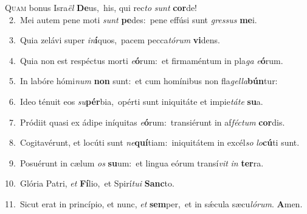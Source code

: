 \lettrine{\initial\textcolor{\initialcolor}{Q}}{uam} bonus Isra\textit{ël} \textbf{De}\-us,~\star his, qui rec\textit{to} \textit{sunt} \textbf{cor}\-de!\\
{\numbfont\textcolor{\numbcolor}{~2.}}~Mei autem pene moti \textit{sunt} \textbf{pe}\-des:~\star pene effúsi sunt \textit{gres}\-\textit{sus} \textbf{me}\-i.\par
{\numbfont\textcolor{\numbcolor}{~3.}}~Quia zelávi super \textit{in}\-\textbf{í}quos,~\star pacem pecca\-\textit{tó}\-\textit{rum} \textbf{vi}\-dens.\par
{\numbfont\textcolor{\numbcolor}{~4.}}~Quia non est respéctus morti \textit{e}\-\textbf{ó}rum:~\star et firmaméntum in pla\textit{ga} \textit{e}\-\textbf{ó}rum.\par
{\numbfont\textcolor{\numbcolor}{~5.}}~In labóre hómi\textit{num} \textbf{non} sunt:~\star et cum homínibus non fla\-\textit{gel}\-\textit{la}\textbf{bún}tur:\par
{\numbfont\textcolor{\numbcolor}{~6.}}~Ideo ténuit eos \textit{su}\-\textbf{pér}bia,~\star opérti sunt iniquitáte et impie\-\textit{tá}\-\textit{te} \textbf{su}\-a.\par
{\numbfont\textcolor{\numbcolor}{~7.}}~Pródiit quasi ex ádipe iníquitas \textit{e}\-\textbf{ó}rum:~\star transiérunt in af\-\textit{féc}\-\textit{tum} \textbf{cor}\-dis.\par
{\numbfont\textcolor{\numbcolor}{~8.}}~Cogitavérunt, et locúti sunt \textit{ne}\-\textbf{quí}tiam:~\star iniquitátem in excél\textit{so} \textit{lo}\-\textbf{cú}ti sunt.\par
{\numbfont\textcolor{\numbcolor}{~9.}}~Posuérunt in cælum \textit{os} \textbf{su}\-um:~\star et lingua eórum transí\textit{vit} \textit{in} \textbf{ter}\-ra.\par
{\numbfont\textcolor{\numbcolor}{10.}}~Glória Patri, \textit{et} \textbf{Fí}\-lio,~\star et Spirí\-\textit{tu}\-\textit{i} \textbf{Sanc}\-to.\par
{\numbfont\textcolor{\numbcolor}{11.}}~Sicut erat in princípio, et nunc, \textit{et} \textbf{sem}\-per,~\star et in sǽcula sæcu\-\textit{ló}\-\textit{rum}. \textbf{A}\-men.\par
